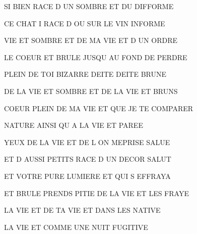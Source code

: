 \documentclass[a4paper,11pt]{article}
\begin{document}
\begin{footnotesize}
\begin{itshape}
 SI BIEN RACE D UN SOMBRE ET DU DIFFORME

 CE CHAT I RACE D OU SUR LE VIN INFORME

 VIE ET SOMBRE ET DE MA VIE ET D UN ORDRE

 LE COEUR ET BRULE JUSQU AU FOND DE PERDRE
\medskip

 PLEIN DE TOI BIZARRE DEITE DEITE BRUNE

 DE LA VIE ET SOMBRE ET DE LA VIE ET BRUNS

 COEUR PLEIN DE MA VIE ET QUE JE TE COMPARER
 
 NATURE AINSI QU A LA VIE ET PAREE
\medskip

 YEUX DE LA VIE ET DE L ON MEPRISE SALUE
 
 ET D AUSSI PETITS RACE D UN DECOR SALUT
 
 ET VOTRE PURE LUMIERE ET QUI S EFFRAYA
\medskip

 ET BRULE PRENDS PITIE DE LA VIE ET LES FRAYE
 
 LA VIE ET DE TA VIE ET DANS LES NATIVE
 
 LA VIE ET COMME UNE NUIT FUGITIVE

\end{itshape}
\end{footnotesize}

 
\end{document}

